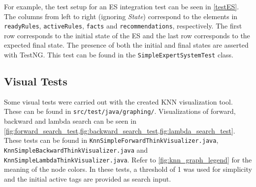 \documentclass[titlepage,11pt]{article}
\newcommand{\code}[1]{\texttt{#1}}
\begin{document}
For example, the test setup for an ES integration test can be seen in \autoref{testES}. The columns from left to right (ignoring \emph{State}) correspond to the elements in \code{readyRules}, \code{activeRules}, \code{facts} and \code{recommendations}, respectively. The first row corresponds to the initial state of the ES and the last row corresponds to the expected final state. The presence of both the initial and final states are asserted with TestNG. This test can be found in the \code{SimpleExpertSystemTest} class.

\subsection{Visual Tests}
Some visual tests were carried out with the created KNN visualization tool. These can be found in \code{src/test/java/graphing/}. Visualizations of forward, backward and lambda search can be seen in \cref{fig:forward_search_test,fig:backward_search_test,fig:lambda_search_test}. These tests can be found in \code{KnnSimpleForwardThinkVisualizer.java}, \code{KnnSimpleBackwardThinkVisualizer.java} and \code{KnnSimpleLambdaThinkVisualizer.java}. Refer to \cref{fig:knn_graph_legend} for the meaning of the node colors. In these tests, a threshold of 1 was used for simplicity and the initial active tags are provided as search input.
\end{document}
